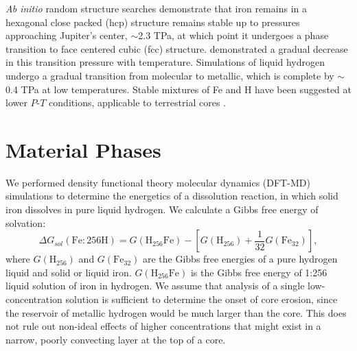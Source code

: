 {\it Ab initio} random structure searches
\citep{Pickard2009} demonstrate that iron remains in a hexagonal close packed (hcp) structure
remains stable up to pressures approaching Jupiter's center, $\sim$2.3 TPa, at
which point it undergoes a phase transition to face centered cubic (fcc)
structure. \citet{stixrude2012} demonstrated a gradual decrease in this transition
pressure with temperature. Simulations of liquid hydrogen
\citep{Militzer2008,militzer2013a,Mcmahon2012} undergo a gradual transition from molecular to
metallic, which is complete by $\sim$ 0.4 TPa at low temperatures.  Stable
mixtures of Fe and H have been suggested at lower $P$-$T$ conditions,
applicable to terrestrial cores \citep{Bazhanova2012}. 

\section{Material Phases}

We performed density functional theory molecular dynamics (DFT-MD) simulations
to determine the energetics of a dissolution reaction, in which solid iron
dissolves in pure liquid hydrogen. We calculate a Gibbs free energy of
solvation:
\begin{equation} \label{feh_gibbs}
  \Delta G_{sol}\left(\mathrm{Fe}:256\mathrm{H}\right) = G\left(\mathrm{H}_{256}\mathrm{Fe}\right) -
  \left[ G\left(\mathrm{H}_{256}\right) +
    \frac{1}{32}G\left(\mathrm{Fe}_{32}\right) \right]\mathrm{,}
\end{equation}
where $G\left(\mathrm{H}_{256}\right)$ and $G\left(\mathrm{Fe}_{32}\right)$
are the Gibbs free
energies of a pure hydrogen liquid and solid or liquid iron.
$G\left(\mathrm{H}_{256}\mathrm{Fe}\right)$ is the Gibbs free energy of 1:256 liquid solution of iron
in hydrogen. We assume that analysis of a single low-concentration solution is
sufficient to determine the onset of core erosion, since the reservoir of
metallic hydrogen would be much larger than the core. This does not rule out
non-ideal effects of higher concentrations that might exist in a narrow,
poorly convecting layer at the top of a core. 

